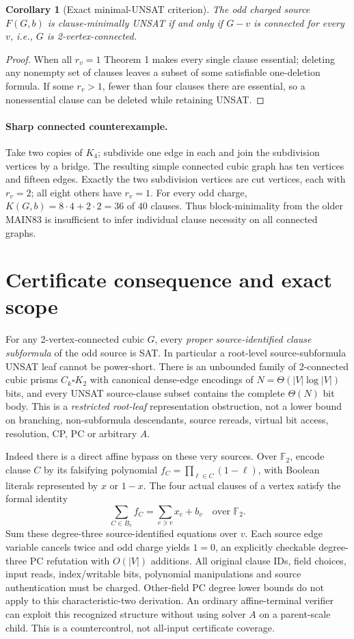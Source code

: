 \documentclass[11pt]{article}
\newtheorem{corollary}[theorem]{Corollary}
\begin{document}
\begin{corollary}[Exact minimal-UNSAT criterion]
The odd charged source $F(G,b)$ is clause-minimally UNSAT
if and only if $G-v$ is connected for every $v$, i.e.,
$G$ is 2-vertex-connected.
\end{corollary}
\begin{proof}
When all $r_v=1$ Theorem 1 makes every single clause essential;
deleting any nonempty set of clauses leaves a subset of some
satisfiable one-deletion formula.
If some $r_v>1$, fewer than four clauses there are essential,
so a nonessential clause can be deleted while retaining UNSAT.
\end{proof}

\paragraph{Sharp connected counterexample.}
Take two copies of $K_4$; subdivide one edge in each and join
the subdivision vertices by a bridge.
The resulting simple connected cubic graph has ten vertices
and fifteen edges. Exactly the two subdivision vertices are
cut vertices, each with $r_v=2$; all eight others have $r_v=1$.
For every odd charge,
$K(G,b)=8\cdot4+2\cdot2=36$ of $40$ clauses.
Thus block-minimality from the older MAIN83 is insufficient
to infer individual clause necessity on all connected graphs.

\section{Certificate consequence and exact scope}
For any 2-vertex-connected cubic $G$, every
\emph{proper source-identified clause subformula} of
the odd source is SAT. In particular a root-level
source-subformula UNSAT leaf cannot be power-short.
There is an unbounded family of 2-connected cubic prisms
$C_k\square K_2$ with canonical dense-edge encodings
of $N=\Theta(|V|\log|V|)$ bits, and every UNSAT
source-clause subset contains the complete $\Theta(N)$
bit body. This is a \emph{restricted root-leaf}
representation obstruction, not a lower bound on
branching, non-subformula descendants, source rereads,
virtual bit access, resolution, CP, PC or arbitrary $A$.

Indeed there is a direct affine bypass on these very sources.
Over $\mathbb F_2$, encode clause $C$ by its falsifying
polynomial $f_C=\prod_{\ell\in C}(1-\ell)$,
with Boolean literals represented by $x$ or $1-x$.
The four actual clauses of a vertex satisfy the formal identity
\[
\sum_{C\in B_v} f_C=\sum_{e\ni v}x_e+b_v
\quad\text{over }\mathbb F_2 .
\]
Sum these degree-three source-identified equations over $v$.
Each source edge variable cancels twice and odd charge yields
$1=0$, an explicitly checkable degree-three PC refutation
with $O(|V|)$ additions.
All original clause IDs, field choices, input reads,
index/writable bits, polynomial manipulations and source
authentication must be charged. Other-field PC degree lower
bounds do not apply to this characteristic-two derivation.
An ordinary affine-terminal verifier can exploit this recognized
structure without using solver $A$ on a parent-scale child.
This is a countercontrol, not all-input certificate coverage.
\end{document}
